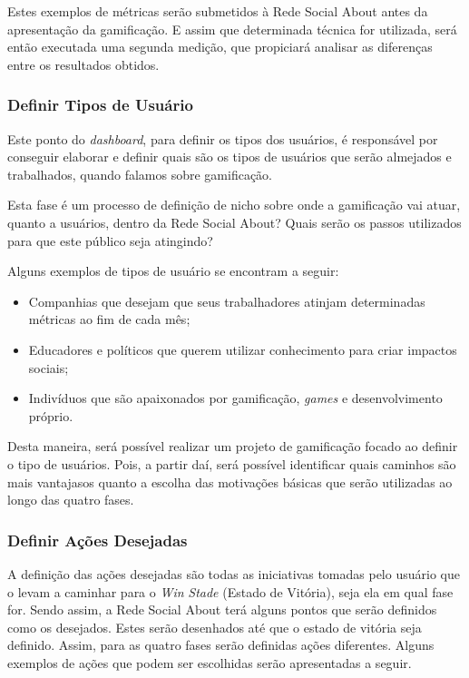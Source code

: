 Estes exemplos de métricas serão submetidos à Rede Social About antes da apresentação da
gamificação. E assim que determinada técnica for utilizada, será então executada
 uma
segunda medição, que propiciará analisar as diferenças entre os resultados obtidos.

\subsubsection{Definir Tipos de Usuário}
\label{sub:define_user_types}
Este ponto do \textit{dashboard}, para definir os tipos dos usuários, é responsável por conseguir
elaborar e definir quais são os tipos de usuários que serão almejados e trabalhados, quando
falamos sobre gamificação.

Esta fase é um processo de definição de nicho sobre onde a gamificação vai atuar, quanto a
usuários, dentro da Rede Social About? Quais serão os passos utilizados para que este público
seja atingindo?

Alguns exemplos de tipos de usuário se encontram a seguir:

\begin{itemize}
    \item Companhias que desejam que seus trabalhadores atinjam determinadas métricas
        ao fim de cada mês;
    \item Educadores e políticos que querem utilizar conhecimento para criar impactos
        sociais;
    \item Indivíduos que são apaixonados por gamificação, \textit{games} e desenvolvimento próprio.
\end{itemize}

Desta maneira, será possível realizar um projeto de gamificação focado ao definir o tipo
de usuários. Pois, a partir daí, será possível identificar quais caminhos são mais vantajasos
quanto a escolha das motivações básicas que serão utilizadas ao longo das quatro fases.

\subsubsection{Definir Ações Desejadas}
\label{sub:define_desired_actions}
A definição das ações desejadas são todas as iniciativas tomadas pelo usuário que o levam a caminhar para
o \textit{Win} \textit{Stade} (Estado de Vitória), seja ela em qual fase for. Sendo assim, a Rede Social
About terá alguns pontos que serão definidos como os desejados. Estes serão desenhados
até que o estado de vitória seja definido. Assim, para as quatro fases serão definidas
ações diferentes. Alguns exemplos de ações que podem ser escolhidas serão apresentadas
a seguir.

